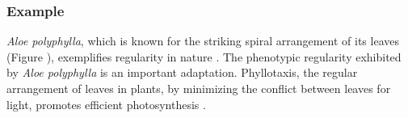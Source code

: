 \subsubsection{Example}
\textit{Aloe polyphylla}, which is known for the striking spiral arrangement of its leaves (Figure ), exemplifies regularity in nature \cite{RoyalHorticulturalSocietyAloePolyphylla}. The phenotypic regularity exhibited by \textit{Aloe polyphylla} is an important adaptation. Phyllotaxis, the regular arrangement of leaves in plants, by minimizing the conflict between leaves for light, promotes efficient photosynthesis \cite{Kappraff2004GrowthNumber}.
